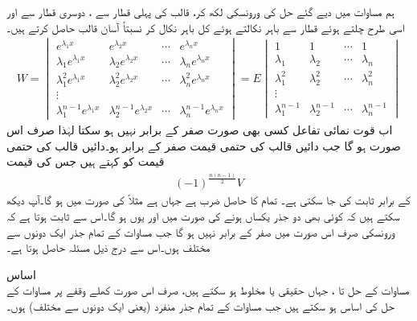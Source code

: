 ہم مساوات  میں دیے گئے حل کی ورونسکی لکھ کر، قالب کی پہلی قطار سے ، دوسری قطار سے  اور اسی طرح چلتے ہوئے  قطار سے   باہر نکالتے ہوئے کل  باہر  نکال کر نسبتاً آسان قالب حاصل کرتے ہیں۔
\begin{align*}
W=
\begin{vmatrix}
e^{\lambda_1 x} & e^{\lambda_2 x} & \cdots & e^{\lambda_n x}\\
\lambda_1e^{\lambda_1 x} & \lambda_2e^{\lambda_2 x} & \cdots & \lambda_ne^{\lambda_n x}\\
\lambda_1^2 e^{\lambda_1 x} & \lambda_2^2 e^{\lambda_2 x} & \cdots & \lambda_n^2 e^{\lambda_n x}\\
\vdots & & \\ 
\lambda_1^{n-1}e^{\lambda_1 x} & \lambda_2^{n-1}e^{\lambda_2 x} & \cdots & \lambda_n^{n-1} e^{\lambda_n x}
\end{vmatrix}
=E
\begin{vmatrix}
1& 1 & \cdots & 1\\
\lambda_1& \lambda_2 & \cdots & \lambda_n\\
\lambda_1^2& \lambda_2^2 & \cdots & \lambda_n^2\\
\vdots & & \\ 
\lambda_1^{n-1} & \lambda_2^{n-1} & \cdots & \lambda_n^{n-1} 
\end{vmatrix}
\end{align*}
اب قوت نمائی تفاعل  کسی بھی صورت صفر کے برابر نہیں ہو سکتا لہٰذا  صرف اس صورت ہو گا جب دائیں قالب کی حتمی قیمت صفر کے برابر ہو۔دائیں قالب کی حتمی قیمت کو  کہتے ہیں جس کی قیمت
\begin{align}
(-1)^{\frac{n(n-1)}{2}}V
\end{align}
کے برابر ثابت کی جا سکتی ہے۔  تمام  کا حاصل ضرب ہے جہاں  ہے مثلاً  کی صورت میں  ہو گا۔آپ دیکھ سکتے ہیں کہ کوئی بھی دو جذر یکساں ہونے کی صورت میں  اور یوں  ہو گا۔اس سے ثابت ہوتا ہے کہ ورونسکی صرف اس صورت میں صفر کے برابر نہیں ہو گا جب مساوات  کے تمام جذر ایک دونوں سے مختلف ہوں۔اس سے  درج ذیل مسئلہ حاصل ہوتا ہے۔

 \quad اساس\\
مساوات  کے حل  تا ، جہاں  حقیقی یا مخلوط ہو سکتے ہیں، صرف اس صورت کھلے وقفے پر مساوات  کے حل کی اساس ہو سکتے ہیں جب مساوات  کے تمام  جذر منفرد (یعنی ایک دونوں سے مختلف) ہوں۔
